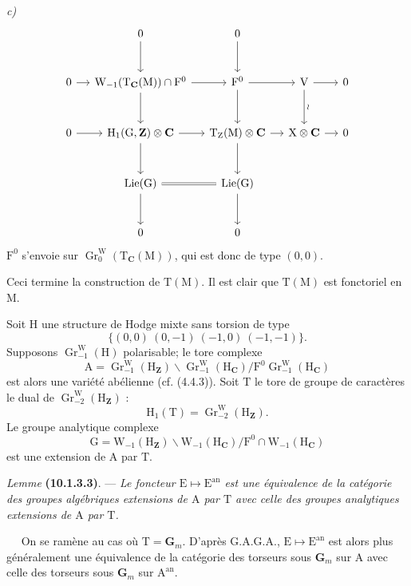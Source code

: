\documentclass[11pt,leqno]{article}
\newcommand{\Page}[1]{\ifvmode\noindent\else\unskip\ \fi{\footnotesize\textcolor{gray}{[p.\,#1]}}\ \ignorespaces}
\begin{document}
\textit{c)}
\[
\begin{tikzcd}[column sep=1.2em, row sep=2.8em]
& 0 \arrow[d] & 0 \arrow[d] & &
\\
0 \arrow[r]
&
\mathrm{W}_{-1}(\mathrm{T}_{\mathbf{C}}(\mathrm{M}))\cap\mathrm{F}^0
  \arrow[r] \arrow[d]
&
\mathrm{F}^0 \arrow[r] \arrow[d]
&
\mathrm{V} \arrow[r] \arrow[d, "\wr"]
&
0
\\
0 \arrow[r]
&
\mathrm{H}_1(\mathrm{G},\mathbf{Z})\otimes\mathbf{C}
  \arrow[r] \arrow[d]
&
\mathrm{T}_{\mathrm{Z}}(\mathrm{M})\otimes\mathbf{C}
  \arrow[r] \arrow[d]
&
\mathrm{X}\otimes\mathbf{C} \arrow[r]
&
0
\\
&
\operatorname{Lie}(\mathrm{G}) \arrow[r, equal] \arrow[d]
&
\operatorname{Lie}(\mathrm{G}) \arrow[d]
& &
\\
& 0 & 0 & &
\end{tikzcd}
\]
\(\mathrm{F}^0\) s’envoie sur
\(\operatorname{Gr}^{\mathrm{W}}_0(\mathrm{T}_{\mathbf{C}}(\mathrm{M}))\),
qui est donc de type \((0,0)\).\par
Ceci termine la construction de \(\mathrm{T}(\mathrm{M})\).
Il est clair que \(\mathrm{T}(\mathrm{M})\) est fonctoriel en
\(\mathrm{M}\).

Soit \(\mathrm{H}\) une structure de Hodge mixte sans torsion de type
\[
\{(0,0)\ (0,-1)\ (-1,0)\ (-1,-1)\}.
\]
Supposons \(\operatorname{Gr}^{\mathrm{W}}_{-1}(\mathrm{H})\)
polarisable; le tore complexe
\[
\mathrm{A}
=\operatorname{Gr}^{\mathrm{W}}_{-1}(\mathrm{H}_{\mathbf{Z}})\backslash
\operatorname{Gr}^{\mathrm{W}}_{-1}(\mathrm{H}_{\mathbf{C}})
/
\mathrm{F}^0\operatorname{Gr}^{\mathrm{W}}_{-1}
(\mathrm{H}_{\mathbf{C}})
\]
est alors une variété abélienne (cf. (4.4.3)). Soit \(\mathrm{T}\) le
tore de groupe de caractères le dual de
\(\operatorname{Gr}^{\mathrm{W}}_{-2}(\mathrm{H}_{\mathbf{Z}})\) :
\[
\mathrm{H}_1(\mathrm{T})
=\operatorname{Gr}^{\mathrm{W}}_{-2}(\mathrm{H}_{\mathbf{Z}}).
\]
Le groupe analytique complexe
\[
\mathrm{G}
=\mathrm{W}_{-1}(\mathrm{H}_{\mathbf{Z}})\backslash
\mathrm{W}_{-1}(\mathrm{H}_{\mathbf{C}})
/
\mathrm{F}^0\cap\mathrm{W}_{-1}(\mathrm{H}_{\mathbf{C}})
\]
est une extension de \(\mathrm{A}\) par \(\mathrm{T}\).

\textit{Lemme} \textbf{(10.1.3.3)}. —
\textit{Le foncteur \(\mathrm{E}\mapsto\mathrm{E}^{\mathrm{an}}\)
est une équivalence de la catégorie des groupes algébriques extensions
de \(\mathrm{A}\) par \(\mathrm{T}\) avec celle des groupes analytiques
extensions de \(\mathrm{A}\) par \(\mathrm{T}\).}

\Page{56}
On se ramène au cas où \(\mathrm{T}=\mathbf{G}_m\).
D’après G.A.G.A., \(\mathrm{E}\mapsto\mathrm{E}^{\mathrm{an}}\) est
alors plus généralement une équivalence de la catégorie des torseurs
sous \(\mathbf{G}_m\) sur \(\mathrm{A}\) avec celle des torseurs sous
\(\mathbf{G}_m\) sur \(\mathrm{A}^{\mathrm{an}}\).
\end{document}
